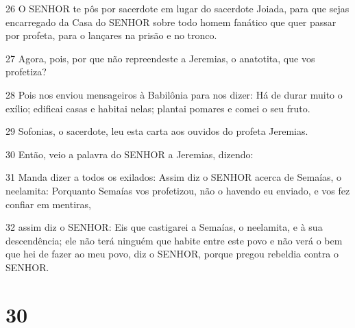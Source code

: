 \par 26 O SENHOR te pôs por sacerdote em lugar do sacerdote Joiada, para que sejas encarregado da Casa do SENHOR sobre todo homem fanático que quer passar por profeta, para o lançares na prisão e no tronco.
\par 27 Agora, pois, por que não repreendeste a Jeremias, o anatotita, que vos profetiza?
\par 28 Pois nos enviou mensageiros à Babilônia para nos dizer: Há de durar muito o exílio; edificai casas e habitai nelas; plantai pomares e comei o seu fruto.
\par 29 Sofonias, o sacerdote, leu esta carta aos ouvidos do profeta Jeremias.
\par 30 Então, veio a palavra do SENHOR a Jeremias, dizendo:
\par 31 Manda dizer a todos os exilados: Assim diz o SENHOR acerca de Semaías, o neelamita: Porquanto Semaías vos profetizou, não o havendo eu enviado, e vos fez confiar em mentiras,
\par 32 assim diz o SENHOR: Eis que castigarei a Semaías, o neelamita, e à sua descendência; ele não terá ninguém que habite entre este povo e não verá o bem que hei de fazer ao meu povo, diz o SENHOR, porque pregou rebeldia contra o SENHOR.

\chapter{30}

